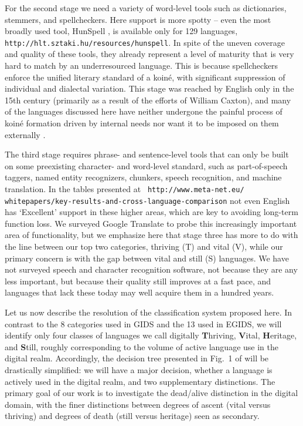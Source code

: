 \documentclass[10pt]{article}
\begin{document}
For the second stage we need a variety of word-level tools such as
dictionaries, stemmers, and spellcheckers. Here support is more spotty -- even
the most broadly used tool, HunSpell \cite{Nemeth:2004}, is available only for
129 languages, {\tt http://hlt.sztaki.hu/resources/hunspell}. In spite of the
uneven coverage and quality of these tools, they already represent a level of
maturity that is very hard to match by an underresourced language. This is
because spellcheckers enforce the unified literary standard of a koin\'e, with
significant suppression of individual and dialectal variation. This stage was
reached by English only in the 15th century (primarily as a result of the
efforts of William Caxton), and many of the languages discussed here have
neither undergone the painful process of koin\'e formation driven by internal
needs nor want it to be imposed on them externally \cite{smh:2006}. 

The third stage requires phrase- and sentence-level tools that can only be
built on some preexisting character- and word-level standard, such as
part-of-speech taggers, named entity recognizers, chunkers, speech
recognition, and machine translation. In the tables presented at {\tt
  http://www.meta-net.eu/
  whitepapers/key-results-and-cross-language-comparison} not even English has
`Excellent' support in these higher areas, which are key to avoiding long-term
function loss. We surveyed Google Translate to probe this increasingly
important area of functionality, but we emphasize here that stage three has
more to do with the line between our top two categories, thriving (T) and
vital (V), while our primary concern is with the gap between
vital and {\color{black} still (S) languages}. We have not surveyed speech and character recognition
software, not because they are any less important, but because their quality
still improves at a fast pace, and languages that lack these today may well
acquire them in a hundred years.

{\color{black} Let us now describe the resolution of the classification system proposed
here. In contrast to the 8 categories used in GIDS and the 13 used in EGIDS,
we will identify only four classes of languages we call digitally {\bf
  T}hriving, {\bf V}ital, {\bf H}eritage, and {\bf S}till, roughly
corresponding to the volume of active language use in the digital
realm. Accordingly, the decision tree presented in Fig.~1 of \cite{Lewis:2010}
will be drastically simplified: we will have a major decision, whether a
language is actively used in the digital realm, and two supplementary
distinctions. The primary goal of our work is to investigate the dead/alive
distinction in the digital domain, with the finer distinctions between degrees
of ascent (vital versus thriving) and degrees of death (still versus
heritage) seen as secondary.}
\end{document}
